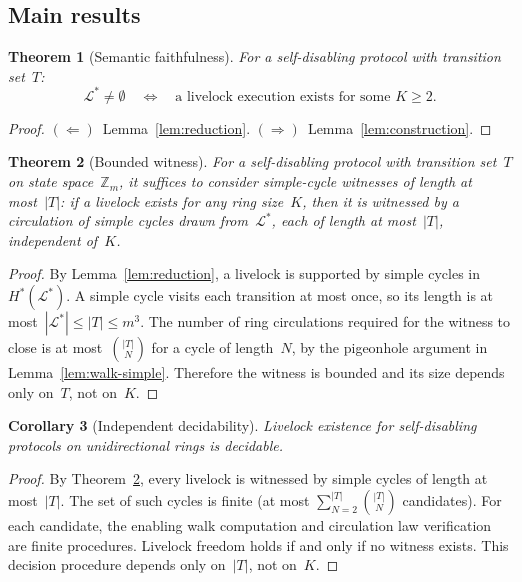 \documentclass{article}
\newtheorem{theorem}{Theorem}
\newtheorem{corollary}[theorem]{Corollary}
\newcommand{\Ls}{\mathcal{L}^{*}}
\newcommand{\Zm}{\mathbb{Z}_m}
\newcommand{\Hstar}{H^{*}}
\begin{document}
\subsection{Main results}

\begin{theorem}[Semantic faithfulness]\label{thm:faithful}
For a self-disabling protocol with transition set~$T$:
\[
  \Ls \neq \emptyset
  \quad\Longleftrightarrow\quad
  \text{a livelock execution exists for some~$K \geq 2$.}
\]
\end{theorem}

\begin{proof}
$(\Leftarrow)$~Lemma~\ref{lem:reduction}.
$(\Rightarrow)$~Lemma~\ref{lem:construction}.
\end{proof}

\begin{theorem}[Bounded witness]\label{thm:bounded}
For a self-disabling protocol with transition set~$T$ on state
space~$\Zm$, it suffices to consider simple-cycle witnesses of
length at most~$|T|$: if a livelock exists for any ring size~$K$,
then it is witnessed by a circulation of simple cycles drawn
from~$\Ls$, each of length at most~$|T|$, independent of~$K$.
\end{theorem}

\begin{proof}
By Lemma~\ref{lem:reduction}, a livelock is supported by
simple cycles in~$\Hstar(\Ls)$.
A simple cycle visits each transition at most once, so its
length is at most~$|\Ls| \leq |T| \leq m^3$.
The number of ring circulations required for the witness
to close is at most~$\binom{|T|}{N}$ for a cycle of
length~$N$, by the pigeonhole argument in
Lemma~\ref{lem:walk-simple}.
Therefore the witness is bounded and its size depends only
on~$T$, not on~$K$.
\end{proof}

\begin{corollary}[Independent decidability]
\label{cor:decidability}
Livelock existence for self-disabling protocols on
unidirectional rings is decidable.
\end{corollary}

\begin{proof}
By Theorem~\ref{thm:bounded}, every livelock is witnessed
by simple cycles of length at most~$|T|$.
The set of such cycles is finite (at most
$\sum_{N=2}^{|T|} \binom{|T|}{N}$ candidates).
For each candidate, the enabling walk computation and
circulation law verification are finite procedures.
Livelock freedom holds if and only if no witness exists.
This decision procedure depends only on~$|T|$, not on~$K$.
\end{proof}
\end{document}
